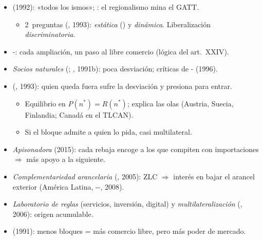 \documentclass{article}
\begin{document}
\begin{columnas}
\begin{itemize}
\item {} (1992): «todos los ismos»; : el regionalismo mina el GATT.
  \begin{itemize}
  \item 2~preguntas (, 1993): \emph{estática} () y \emph{dinámica}. Liberalización \emph{discriminatoria}.
  \end{itemize}
\end{itemize}
\begin{itemize}
\item {}-: cada ampliación, un paso al libre comercio (lógica del art.~XXIV).
\item \emph{Socios naturales} (; , 1991b): poca desviación; críticas de - (1996).
\item {} (, 1993): quien queda fuera sufre la desviación y presiona para entrar.
  \begin{itemize}
  \item Equilibrio en $P(n^*)=R(n^*)$; explica las olas (Austria, Suecia, Finlandia; Canadá en el TLCAN).
  \item Si el bloque admite a quien lo pida, casi multilateral.
  \end{itemize}
\end{itemize}
\begin{itemize}
\item \emph{Apisonadora} (2015): cada rebaja encoge a los que compiten con importaciones $\Rightarrow$ más apoyo a la siguiente.
\item \emph{Complementariedad arancelaria} (, 2005): ZLC $\Rightarrow$ interés en bajar el arancel exterior (América Latina, --, 2008).
\item \emph{Laboratorio de reglas} (servicios, inversión, digital) y \emph{multilateralización} (, 2006): origen acumulable.
\end{itemize}
\begin{itemize}
\item {} (1991): menos bloques = más comercio libre, pero más poder de mercado.

\end{itemize}
\end{columnas}
\end{document}
